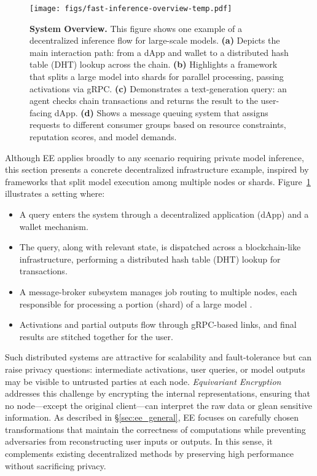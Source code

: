 \documentclass[10pt]{article}
\begin{document}
\begin{figure}[!t]
  \centering
  \texttt{[image: figs/fast-inference-overview-temp.pdf]}
  \caption{\textbf{System Overview.} 
  This figure shows one example of a decentralized inference flow for large-scale models.
  \textbf{(a)} Depicts the main interaction path: from a dApp and wallet to a distributed hash table (DHT) lookup across the chain. 
  \textbf{(b)} Highlights a framework that splits a large model into shards for parallel processing, passing activations via gRPC. 
  \textbf{(c)} Demonstrates a text-generation query: an agent checks chain transactions and returns the result to the user-facing dApp. 
  \textbf{(d)} Shows a message queuing system that assigns requests to different consumer groups based on resource constraints, reputation scores, and model demands.}
  \label{fig:bsns_architecture}
\end{figure}

Although EE applies broadly to any scenario requiring private model inference, this section presents a concrete decentralized infrastructure example, inspired by frameworks that split model execution among multiple nodes or shards. 
Figure~\ref{fig:bsns_architecture} illustrates a setting where:
\begin{itemize}
    \item A query enters the system through a decentralized application (dApp) \cite{zheng2020overview} and a wallet mechanism.
    \item The query, along with relevant state, is dispatched across a blockchain-like infrastructure, performing a distributed hash table (DHT) lookup for transactions.
    \item A message-broker subsystem manages job routing to multiple nodes, each responsible for processing a portion (shard) of a large model \cite{rajbhandari2020zero}.
    \item Activations and partial outputs flow through gRPC-based links, and final results are stitched together for the user.
\end{itemize}



Such distributed systems are attractive for scalability and fault-tolerance but can raise privacy questions: 
intermediate activations, user queries, or model outputs may be visible to untrusted parties at each node. 
\emph{Equivariant Encryption} addresses this challenge by encrypting the internal representations, ensuring that no node—except the original client—can interpret the raw data or glean sensitive information. 
As described in \S\ref{sec:ee_general}, EE focuses on carefully chosen transformations that maintain the correctness of computations while preventing adversaries from reconstructing user inputs or outputs. 
In this sense, it complements existing decentralized methods by preserving high performance without sacrificing privacy.
\end{document}
